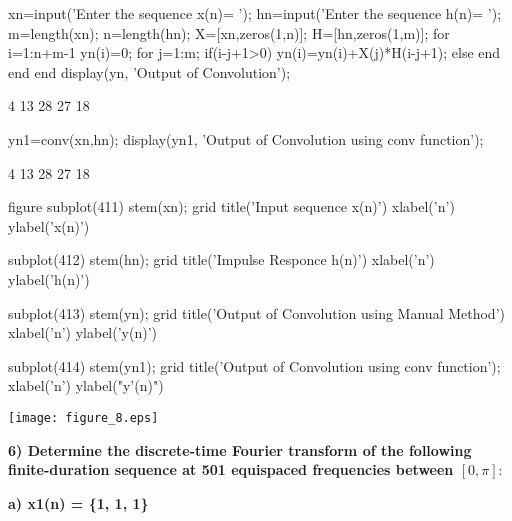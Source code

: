 \documentclass[12pt, onecolumn]{IEEEtran}
\begin{document}
	\begin{matlabcode}
		xn=input('Enter the sequence x(n)= ');
		hn=input('Enter the sequence h(n)= ');
		m=length(xn);
		n=length(hn);
		X=[xn,zeros(1,n)];
		H=[hn,zeros(1,m)]; 
		for i=1:n+m-1
		yn(i)=0;
		for j=1:m;
		if(i-j+1>0)
		yn(i)=yn(i)+X(j)*H(i-j+1);
		else
		end
		end
		end
		display(yn, 'Output of Convolution');
	\end{matlabcode}
	\begin{matlaboutput}
		4    13    28    27    18
	\end{matlaboutput}
	\begin{matlabcode}
		yn1=conv(xn,hn);
		display(yn1, 'Output of Convolution using conv function');
	\end{matlabcode}
	\begin{matlaboutput}
		4    13    28    27    18
	\end{matlaboutput}
	\begin{matlabcode}
		
		figure
		subplot(411)
		stem(xn); grid
		title('Input sequence x(n)')
		xlabel('n')
		ylabel('x(n)')
		
		subplot(412)
		stem(hn); grid
		title('Impulse Responce h(n)')
		xlabel('n')
		ylabel('h(n)')
		
		subplot(413)
		stem(yn); grid
		title('Output of Convolution using Manual Method')
		xlabel('n')
		ylabel('y(n)')
		
		subplot(414)
		stem(yn1); grid
		title('Output of Convolution using conv function');
		xlabel('n')
		ylabel("y'(n)")
	\end{matlabcode}
	\begin{center}
		\texttt{[image: figure\_8.eps]}
	\end{center}
	
	\begin{par}
		\begin{flushleft}
			\textbf{6) Determine the discrete-time Fourier transform of the following finite-duration sequence at 501 equispaced frequencies between $[0,\pi]: $}
		\end{flushleft}
	\end{par}
	
	\begin{par}
		\begin{flushleft}
			\textbf{a) x1(n) = \{1, 1, 1\}} 
		\end{flushleft}
	\end{par}
	
\end{document}
